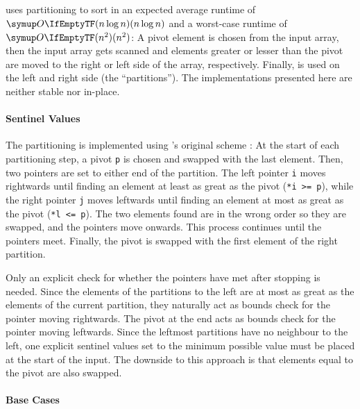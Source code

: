 \subsection{\texorpdfstring{\QS{}}{QuickSort}}
\label{subsec:tasklet:quick}

\QS{} \cite{hoare1962quicksort} uses partitioning to sort in an expected average runtime of \(\bigoh{n \log n}\) and a worst-case runtime of \(\bigoh{n^2}\):
A pivot element is chosen from the input array, then the input array gets scanned and elements greater or lesser than the pivot are moved to the right or left side of the array, respectively.
Finally, \QS{} is used on the left and right side (the \enquote{partitions}).
The \QS*{} implementations presented here are neither stable nor in-place.


\paragraph{Sentinel Values}
The partitioning is implemented using \citeauthor{hoare1962quicksort}'s original scheme \cite{hoare1962quicksort}:
At the start of each partitioning step, a pivot \lstinline|p| is chosen and swapped with the last element.
Then, two pointers are set to either end of the partition.
The left pointer \lstinline|i| moves rightwards until finding an element at least as great as the pivot (\lstinline|*i >= p|), while the right pointer \lstinline|j| moves leftwards until finding an element at most as great as the pivot (\lstinline|*l <= p|).
The two elements found are in the wrong order so they are swapped, and the pointers move onwards.
This process continues until the pointers meet.
Finally, the pivot is swapped with the first element of the right partition.

Only an explicit check for whether the pointers have met after stopping is needed.
Since the elements of the partitions to the left are at most as great as the elements of the current partition, they naturally act as bounds check for the pointer moving rightwards.
The pivot at the end acts as bounds check for the pointer moving leftwards.
Since the leftmost partitions have no neighbour to the left, one explicit sentinel values set to the minimum possible value must be placed at the start of the input.
The downside to this approach is that elements equal to the pivot are also swapped.

\paragraph{Base Cases}

